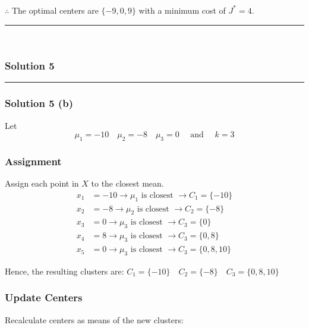 \documentclass{article}
\begin{document}
\subsubsection*{\normalfont}{$\therefore$ The optimal centers are $\{-9, 0, 9\}$ with a minimum cost of $J^*=4$.}

\noindent\rule{\textwidth}{0.4pt}\\

\newpage

\subsubsection*{Solution 5}
\noindent\rule{\textwidth}{0.4pt}
\subsubsection*{Solution 5 (b)}
Let
$$\mu_1 = -10 \quad \mu_2 = -8 \quad \mu_3 = 0 \quad \text{ and } \quad k = 3$$
\subsubsection*{Assignment}
Assign each point in $X$ to the closest mean.
\begin{align*}
  x_1 &= -10 \rightarrow \mu_1 \text{ is closest } \rightarrow C_1 = \{-10\} \\
  x_2 &= -8 \rightarrow \mu_2 \text{ is closest } \rightarrow C_2 = \{-8\} \\
  x_3 &= 0 \rightarrow \mu_3 \text{ is closest } \rightarrow C_3 = \{0\} \\
  x_4 &= 8 \rightarrow \mu_3 \text{ is closest } \rightarrow C_3 = \{0, 8\} \\
  x_5 &= 0 \rightarrow \mu_3 \text{ is closest } \rightarrow C_3 = \{0, 8 ,10\} 
\end{align*}

\begin{flushleft}
  Hence, the resulting clusters are: $C_1 = \{-10\} \quad C_2 = \{-8\} \quad C_3 = \{0, 8, 10\}$
\end{flushleft}


\subsubsection*{Update Centers}
\begin{flushleft}
Recalculate centers as means of the new clusters:
\end{flushleft}
\end{document}
